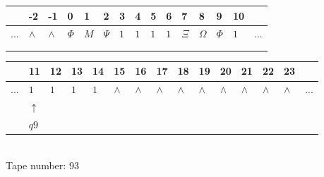 \documentclass[11pt]{article}
\begin{document}
\begin{table}[H]
\centering
\begin{tabular}{lllllllllllllll}
 & -2 & -1 & 0 & 1 & 2 & 3 & 4 & 5 & 6 & 7 & 8 & 9 & 10 & \\
\hline
$...$ & \multicolumn{1}{|l|}{$\wedge$} & \multicolumn{1}{|l|}{$\wedge$} & \multicolumn{1}{|l|}{$\Phi$} & \multicolumn{1}{|l|}{$M$} & \multicolumn{1}{|l|}{$\Psi$} & \multicolumn{1}{|l|}{$1$} & \multicolumn{1}{|l|}{$1$} & \multicolumn{1}{|l|}{$1$} & \multicolumn{1}{|l|}{$1$} & \multicolumn{1}{|l|}{$\Xi$} & \multicolumn{1}{|l|}{$\Omega$} & \multicolumn{1}{|l|}{$\Phi$} & \multicolumn{1}{|l|}{$1$} & $...$\\
\hline
&  &  &  &  &  &  &  &  &  &  &  &  &  &  \\
&  &  &  &  &  &  &  &  &  &  &  &  &  &  \\
\end{tabular}
\begin{tabular}{lllllllllllllll}
 & 11 & 12 & 13 & 14 & 15 & 16 & 17 & 18 & 19 & 20 & 21 & 22 & 23 & \\
\hline
$...$ & \multicolumn{1}{|l|}{$1$} & \multicolumn{1}{|l|}{$1$} & \multicolumn{1}{|l|}{$1$} & \multicolumn{1}{|l|}{$1$} & \multicolumn{1}{|l|}{$\wedge$} & \multicolumn{1}{|l|}{$\wedge$} & \multicolumn{1}{|l|}{$\wedge$} & \multicolumn{1}{|l|}{$\wedge$} & \multicolumn{1}{|l|}{$\wedge$} & \multicolumn{1}{|l|}{$\wedge$} & \multicolumn{1}{|l|}{$\wedge$} & \multicolumn{1}{|l|}{$\wedge$} & \multicolumn{1}{|l|}{$\wedge$} & $...$\\
\hline
& $\uparrow$ &  &  &  &  &  &  &  &  &  &  &  &  &  \\
& $ q9 $ &  &  &  &  &  &  &  &  &  &  &  &  &  \\
\end{tabular}
\\
Tape number: 93
\noindent\makebox[\linewidth]{\hdashrule{\textwidth}{1pt}{1pt}}\end{table}
\end{document}
